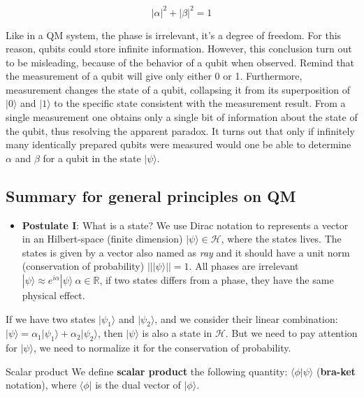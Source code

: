 \begin{equation*}
    |\alpha|^2+|\beta|^2=1
\end{equation*}

Like in a QM system, the phase is irrelevant, it's a degree of freedom. For this reason, qubits could store infinite information. However, this conclusion turn out to be misleading, because of the behavior of a qubit when observed. Remind that the measurement of a qubit will give only either 0 or 1. Furthermore, measurement changes the state of a qubit, collapsing it from its superposition of $|0\rangle$ and $|1\rangle$ to the specific state consistent with the measurement result. From a single measurement one obtains only a single bit of information about the state of the qubit, thus resolving the apparent paradox. It turns out that only if infinitely many identically prepared qubits were measured would one be able to determine $\alpha$ and $\beta$ for a qubit in the state $|\psi\rangle$.

\subsection*{Summary for general principles on QM}
\begin{itemize}
    \item \textbf{Postulate I}: What is a state? We use Dirac notation to represents a vector in an Hilbert-space (finite dimension) $|\psi\rangle \in \mathcal{H}$, where the states lives. The states is given by a vector also named as \textit{ray} and it should have a unit norm (conservation of probability) $|| |\psi\rangle ||=1$. All phases are irrelevant $|\psi\rangle \approx e^{i\alpha}|\psi\rangle \ \alpha\in\mathbb{R}$, if two states differs from a phase, they have the same physical effect.
\end{itemize}
If we have two states $|\psi_1\rangle$ and $|\psi_2\rangle$, and we consider their linear combination: $|\psi\rangle = \alpha_1|\psi_1\rangle+\alpha_2|\psi_2\rangle$, then $|\psi\rangle$ is also a state in $\mathcal{H}$. But we need to pay attention for $|\psi\rangle$, we need to normalize it for the conservation of probability.

\begin{definition}{Scalar product}
    We define \textbf{scalar product} the following quantity: $\langle\phi|\psi\rangle$ (\textbf{bra-ket} notation), where $\langle\phi|$ is the dual vector of $|\phi\rangle$.
\end{definition}

